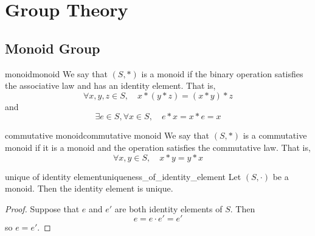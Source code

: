 \documentclass[11pt,lang=en]{elegantbook}
\begin{document}
\chapter{Group Theory}


\section{Monoid Group}

\begin{definition}{monoid}{monoid}
  We say that $(S, \ast)$ is a monoid if the binary operation satisfies the associative law and has an identity element. That is,
  \[
  \forall x, y, z \in S, \quad x \ast (y \ast z) = (x \ast y) \ast z
  \]
  and
  \[
  \exists e \in S, \forall x \in S, \quad e \ast x = x \ast e = x
  \]
\end{definition}


\begin{definition}{commutative monoid}{commutative monoid}
  We say that $(S, \ast)$ is a commutative monoid if it is a monoid and the operation satisfies the commutative law. That is,
  \[
  \forall x, y \in S, \quad x \ast y = y \ast x
  \]
\end{definition}

\begin{proposition}{unique of identity element}{uniqueness_of_identity_element}
  Let $(S, \cdot)$ be a monoid. Then the identity element is unique.
\end{proposition}
\begin{proof}
  Suppose that $e$ and $e'$ are both identity elements of $S$. Then
  \[
  e = e \cdot e' = e'
  \]
  so $e = e'$.
\end{proof}
\end{document}
